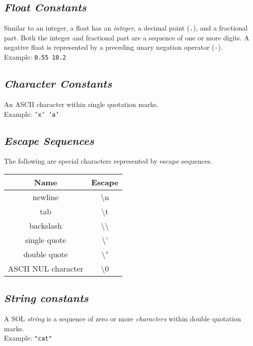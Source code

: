     \subsection{\textit{Float Constants}}
    Similar to an integer, a float has an \textit{integer}, a decimal point (\texttt{.}), and a fractional part. Both the integer and fractional part are a sequence of one or more digits. A negative float is represented by a preceding unary negation operator (\texttt{-}).\\
    Example: \texttt{0.55  10.2}

    \subsection{\textit{Character Constants}}
    An ASCII character within single quotation marks.\\
    Example: \texttt{'x' 'a'}

    \subsection{\textit{Escape Sequences}}
    The following are special characters represented by escape sequences.
        \begin{center}
            \begin{tabular}{ |c|c| }
            \hline
                \textbf{Name}   & \textbf{Escape}\\
                \hline
                newline         & \textbackslash n\\
                tab             & \textbackslash t\\
                backslash       & \textbackslash \textbackslash\\
                single quote    & \textbackslash '\\
                double quote    & \textbackslash "\\
                ASCII NUL character & \textbackslash 0\\
            \hline
            \end{tabular}
        \end{center}

    \subsection{\textit{String constants}}
    A SOL \textit{string} is a sequence of zero or more \textit{characters} within double quotation marks.\\
    Example: \texttt{"cat"}

